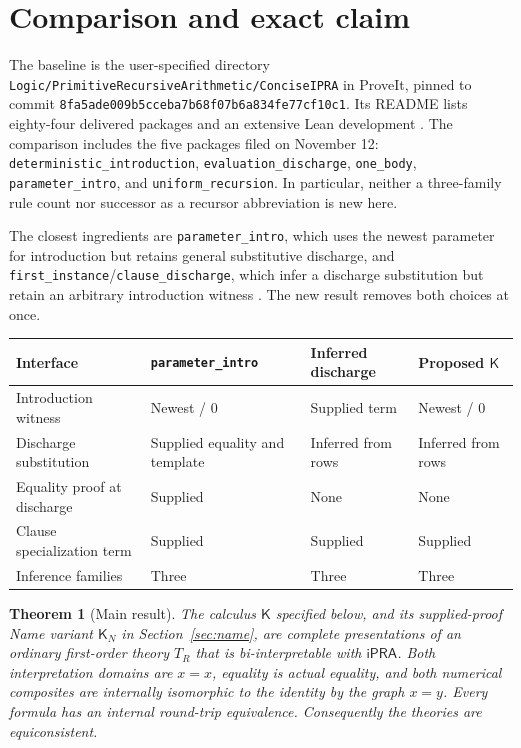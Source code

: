 \documentclass[11pt,letterpaper]{article}
\newtheorem{theorem}{Theorem}[section]
\theoremstyle{definition}\newtheorem{definition}[theorem]{Definition}
\theoremstyle{remark}\newtheorem{remark}[theorem]{Remark}
\newcommand{\ipra}{\mathsf{iPRA}}
\newcommand{\K}{\mathsf K}
\newcommand{\KN}{\mathsf K_{\!N}}
\newcommand{\file}[1]{{\small\nolinkurl{#1}}}
\begin{document}
\section{Comparison and exact claim}
The baseline is the user-specified directory
\file{Logic/PrimitiveRecursiveArithmetic/ConciseIPRA} in ProveIt, pinned to
commit \texttt{8fa5ade009b5cceba7b68f07b6a834fe77cf10c1}.
Its README lists eighty-four delivered packages and an extensive Lean
development \cite{repo}. The comparison includes the five packages filed
on November 12: \file{deterministic_introduction},
\file{evaluation_discharge}, \file{one_body}, \file{parameter_intro}, and
\file{uniform_recursion}. In particular, neither a three-family rule
count nor successor as a recursor abbreviation is new here.

The closest ingredients are \file{parameter_intro}, which uses the newest
parameter for introduction but retains general substitutive discharge,
and \file{first_instance}/\file{clause_discharge}, which infer a discharge
substitution but retain an arbitrary introduction witness
\cite{parameter,export}. The new result removes both choices at once.

\begin{center}\small
\begin{tabularx}{\linewidth}{@{}lXXX@{}}
\toprule
Interface & \file{parameter_intro} & Inferred discharge & Proposed $\K$\\
\midrule
Introduction witness & Newest / $0$ & Supplied term & Newest / $0$\\
Discharge substitution & Supplied equality and template & Inferred from rows & Inferred from rows\\
Equality proof at discharge & Supplied & None & None\\
Clause specialization term & Supplied & Supplied & Supplied\\
Inference families & Three & Three & Three\\
\bottomrule
\end{tabularx}
\end{center}

\begin{theorem}[Main result]\label{thm:main}
The calculus $\K$ specified below, and its supplied-proof Name variant
$\KN$ in Section~\ref{sec:name}, are complete presentations of an ordinary
first-order theory $T_R$ that is bi-interpretable with $\ipra$. Both
interpretation domains are $x=x$, equality is actual equality, and both
numerical composites are internally isomorphic to the identity by the
graph $x=y$. Every formula has an internal round-trip equivalence.
Consequently the theories are equiconsistent.
\end{theorem}
\end{document}
